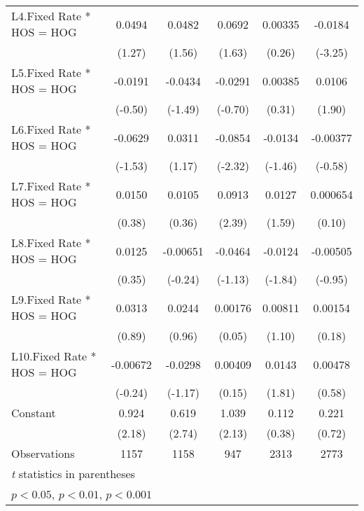 {\begin{longtable}{l*{5}{c}}
L4.Fixed Rate * HOS = HOG&   0.0494         &   0.0482         &   0.0692         &  0.00335         &  -0.0184\sym{**} \\
                &   (1.27)         &   (1.56)         &   (1.63)         &   (0.26)         &  (-3.25)         \\
[1em]
L5.Fixed Rate * HOS = HOG&  -0.0191         &  -0.0434         &  -0.0291         &  0.00385         &   0.0106         \\
                &  (-0.50)         &  (-1.49)         &  (-0.70)         &   (0.31)         &   (1.90)         \\
[1em]
L6.Fixed Rate * HOS = HOG&  -0.0629         &   0.0311         &  -0.0854\sym{*}  &  -0.0134         & -0.00377         \\
                &  (-1.53)         &   (1.17)         &  (-2.32)         &  (-1.46)         &  (-0.58)         \\
[1em]
L7.Fixed Rate * HOS = HOG&   0.0150         &   0.0105         &   0.0913\sym{*}  &   0.0127         & 0.000654         \\
                &   (0.38)         &   (0.36)         &   (2.39)         &   (1.59)         &   (0.10)         \\
[1em]
L8.Fixed Rate * HOS = HOG&   0.0125         & -0.00651         &  -0.0464         &  -0.0124         & -0.00505         \\
                &   (0.35)         &  (-0.24)         &  (-1.13)         &  (-1.84)         &  (-0.95)         \\
[1em]
L9.Fixed Rate * HOS = HOG&   0.0313         &   0.0244         &  0.00176         &  0.00811         &  0.00154         \\
                &   (0.89)         &   (0.96)         &   (0.05)         &   (1.10)         &   (0.18)         \\
[1em]
L10.Fixed Rate * HOS = HOG& -0.00672         &  -0.0298         &  0.00409         &   0.0143         &  0.00478         \\
                &  (-0.24)         &  (-1.17)         &   (0.15)         &   (1.81)         &   (0.58)         \\
[1em]
Constant        &    0.924\sym{*}  &    0.619\sym{**} &    1.039\sym{*}  &    0.112         &    0.221         \\
                &   (2.18)         &   (2.74)         &   (2.13)         &   (0.38)         &   (0.72)         \\
\hline
Observations    &     1157         &     1158         &      947         &     2313         &     2773         \\
\hline\hline
\multicolumn{6}{l}{\footnotesize \textit{t} statistics in parentheses}\\
\multicolumn{6}{l}{\footnotesize \sym{*} \(p<0.05\), \sym{**} \(p<0.01\), \sym{***} \(p<0.001\)}\\
\end{longtable}
}
